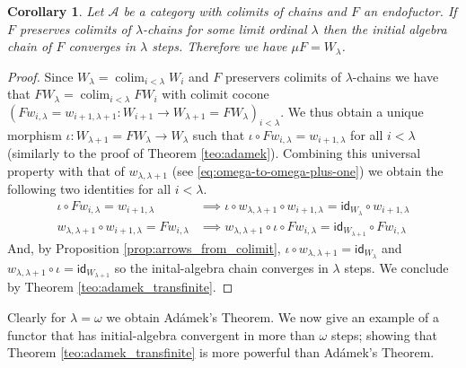 \documentclass[letterpaper, 11pt, oneside]{memoir}
\theoremstyle{myteo}
\newtheorem{corollary}[theorem]{Corollary}
\numberwithin{equation}{section}
\DeclareMathOperator*\colim{colim}
\newcommand{\id}{\textsf{id}}
\newcommand{\A}{\mathscr{A}}
\begin{document}
\begin{corollary}
  \label{coroll:adamek}
  Let \(\A\) be a category with colimits of chains and \(F\) an endofuctor.
  If \(F\) preserves colimits of \(\lambda\)-chains for some limit ordinal \(\lambda\) then the initial algebra chain of \(F\) converges in \(\lambda\) steps.
  Therefore we have \(\mu F = W_\lambda\).
\end{corollary}

\begin{proof}
  Since \(W_\lambda = \colim_{i < \lambda} W_i\) and \(F\) preservers colimits of \(\lambda\)-chains we have that \(FW_\lambda = \colim_{i < \lambda} FW_i\) with colimit cocone \((Fw_{i, \lambda} = w_{i+1, \lambda + 1}: W_{i+1} \to W_{\lambda+1} = FW_\lambda)_{i < \lambda}\).
  We thus obtain a unique morphism \(\iota : W_{\lambda+1} = FW_\lambda \to W_\lambda\) such that \(\iota \circ Fw_{i, \lambda} = w_{i+1, \lambda}\) for all \(i < \lambda\) (similarly to the proof of Theorem \ref{teo:adamek}).
  Combining this universal property with that of \(w_{\lambda, \lambda + 1}\) (see \ref{eq:omega-to-omega-plus-one}) we obtain the following two identities for all \(i < \lambda\).
  \begin{align*}
    \iota \circ Fw_{i, \lambda} = w_{i+1, \lambda} & \implies \iota \circ w_{\lambda, \lambda + 1} \circ w_{i+1, \lambda} = \id_{W_\lambda} \circ w_{i+1, \lambda} \\
    w_{\lambda, \lambda+1} \circ w_{i+1, \lambda} = Fw_{i, \lambda} &\implies w_{\lambda, \lambda+1} \circ \iota \circ Fw_{i, \lambda} = \id_{W_{\lambda+1}} \circ Fw_{i, \lambda}
  \end{align*}
  And, by Proposition \ref{prop:arrows_from_colimit}, \(\iota \circ w_{\lambda, \lambda+1} = \id_{W_\lambda}\) and \(w_{\lambda, \lambda+1} \circ \iota = \id_{W_{\lambda+1}}\) so the inital-algebra chain converges in \(\lambda\) steps.
  We conclude by Theorem \ref{teo:adamek_transfinite}.
\end{proof}

Clearly for \(\lambda = \omega\) we obtain Adámek's Theorem.
We now give an example of a functor that has initial-algebra convergent in more than \(\omega\) steps; showing that Theorem \ref{teo:adamek_transfinite} is more powerful than Adámek's Theorem.
\end{document}
